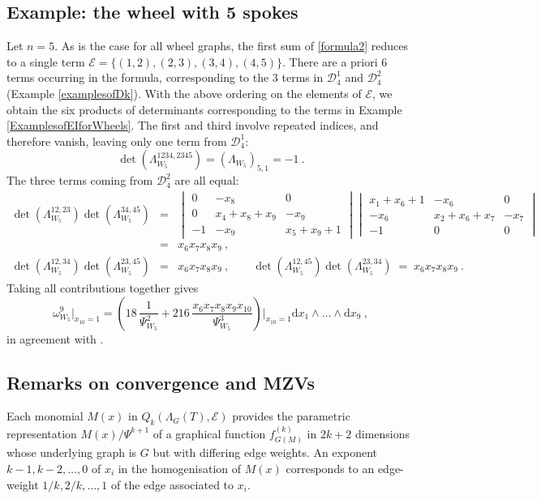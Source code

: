 \documentclass[10pt]{amsart}
\newcommand{\dd}{\mathrm{d}}
\newcommand{\sE}{\mathcal{E}}
\theoremstyle{plain}
\newcommand{\0}{\color{blue}{\mathsf{0}}}
\begin{document}
\subsection{Example: the wheel with 5 spokes}\label{sect: 5spokes}
Let  $n=5$. As is the case for all wheel graphs, the first sum of 
\eqref{formula2} reduces to a single term $\mathcal{E}= \{(1,2),(2,3),(3,4),(4,5)\}$.   There are a priori 6 terms occurring in the formula, corresponding to the 3 terms in $\mathcal{D}^1_4$ and $\mathcal{D}^2_4$ (Example \ref{examplesofDk}). With  the above ordering on the elements of $\mathcal{E}$, we obtain the six products of determinants corresponding to the terms 
in Example \ref{ExamplesofEIforWheels}. The first and third involve repeated indices, and therefore vanish, leaving only one  term from $\mathcal{D}^1_4$:
\[ \det \left(\Lambda_{W_5}^{1234, 2345} \right) = (\Lambda_{W_5})_{5,1} =-1  \ .  \]
The three terms coming from  $\mathcal{D}^2_4$ are all equal: 
\begin{eqnarray*}
\det \left(\Lambda_{W_5}^{12,23}\right)  \det \left( \Lambda_{W_5}^{34,45} \right) 
&= &  
\begin{vmatrix}
    0 & -x_8 &  0 \\
    0 &x_4+x_8+ x_9 & -x_9 \\
    -1 & -x_9 & x_5+ x_9 +1
\end{vmatrix}
\begin{vmatrix}
    x_1 +x_6 +1  & -x_6 &  0 \\
     - x_6 &x_2+x_6+ x_7 & -x_7 \\
    -1 & 0 & 0
\end{vmatrix} \\ 
& = &  x_6x_7x_8 \nonumber 
x_9\ ,\\
\det  \left( \Lambda_{W_5}^{12,34} \right) \det  \left(\Lambda_{W_5}^{23,45} \right)&=& x_6x_7x_8
x_9\ ,\qquad
\det  \left(\Lambda_{W_5}^{12,45} \right) \det \left(\Lambda_{W_5}^{23, 34}\right)\;=\; x_6x_7x_8
x_9\ .
\end{eqnarray*}
Taking all contributions together gives
\[ \omega^9_{W_5} \big|_{x_{10}=1} = \left( 18 \, \frac{1} {\Psi^2_{W_5}} +   216 \, \frac{x_6x_7x_8x_9x_{10}}{\Psi_{W_5}^3} \right)\Bigg|_{x_{10}=1} \dd x_1 \wedge \ldots \wedge \dd x_9 \ , \]
in agreement with \cite{BrSigma}.

\subsection{Remarks on convergence and MZVs}
Each monomial $M(x)$ in $Q_k(\Lambda_G(T),\sE)$ provides the parametric representation $M(x)/\Psi^{k+1}$ of a graphical function  $f_{G(M)}^{(k)}$  in $2k+2$ dimensions \cite{schnetz2014graphical,GolzPanzerSchnetz,BorinskySchnetz}
whose underlying graph is $G$ but with  differing  edge weights.  An exponent $k-1,k-2,\ldots,0$ of $x_i$ in the homogenisation  of $M(x)$ 
corresponds to an edge-weight $1/k, 2/k,\ldots, 1$   of the edge associated to $x_i$.
\end{document}

